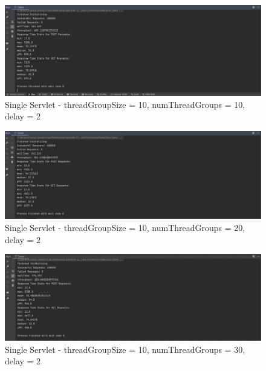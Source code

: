 \documentclass[a4paper,12pt]{article} %
\begin{document}
\begin{enumerate}
\begin{figure}[H]
    \centering
    \includegraphics[width=\textwidth]{images/single_servlet_10.png}
    \caption{Single Servlet - threadGroupSize = 10, numThreadGroups = 10, delay = 2}
\end{figure}
\begin{figure}[H]
    \centering
    \includegraphics[width=\textwidth]{images/single_servlet_20.png}
    \caption{Single Servlet - threadGroupSize = 10, numThreadGroups = 20, delay = 2}
\end{figure}
\begin{figure}[H]
    \centering
    \includegraphics[width=\textwidth]{images/single_servlet_30.png}
    \caption{Single Servlet - threadGroupSize = 10, numThreadGroups = 30, delay = 2}
\end{figure}



\end{enumerate}
\end{document}
